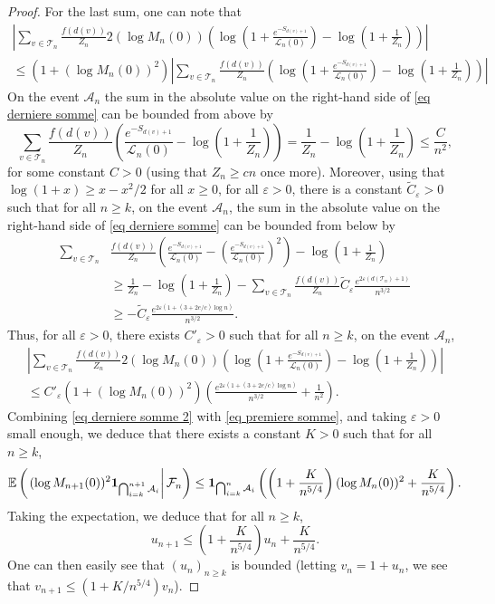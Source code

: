 \documentclass[11pt]{article}
\numberwithin{equation}{section}
\def\vp{\varepsilon}
\def \T{\mathcal{T}}
\def \cL{\mathcal{L}}
\def\E{\mathbb{E}}
\begin{document}
\begin{proof}
	For the last sum, one can note that
	\begin{multline}\label{eq derniere somme}
		 \left\vert\sum_{v \in \T_n} \frac{f(d(v))}{Z_n}2(\log M_n(0))\left(\log \left(1+ \frac{e^{-S_{d(v)+1}} }{\cL_n(0)}\right) -\log\left(1+\frac{1}{Z_n}\right)\right) \right\vert \\ 
		 \le (1+ (\log M_n(0))^2 ) \left\vert \sum_{v \in \T_n} \frac{f(d(v))}{Z_n}\left(  \log \left(1+ \frac{e^{-S_{d(v)+1}} }{\cL_n(0)}\right) -\log\left(1+\frac{1}{Z_n}\right)\right) \right\vert 
	\end{multline}
	On the event $\mathcal{A}_n$ the sum in the absolute value on the right-hand side of \eqref{eq derniere somme} can be bounded from above by
	\[
	\sum_{v \in \T_n} \frac{f(d(v))}{Z_n} \left( \frac{e^{-S_{d(v)+1}}}{\cL_n(0)} - \log \left(1+\frac{1}{Z_n}\right)\right)= \frac{1}{Z_n} - \log \left(1+ \frac{1}{Z_n}\right) \le \frac{C}{n^2},
	\]
	for some constant $C>0$ (using that $Z_n \ge cn$ once more). Moreover, using that $\log(1+x) \ge x-x^2/2$ for all $x\ge 0$, for all $\vp>0$, there is a constant $\widetilde{C}_\vp>0$ such that for all $n\ge k$, on the event $\mathcal{A}_n$, the sum in the absolute value on the right-hand side of \eqref{eq derniere somme} can be bounded from below by
	\begin{align*}
	\sum_{v \in \T_n} &\frac{f(d(v))}{Z_n}\left( \frac{e^{-S_{d(v)+1}}}{\cL_n(0)} - \left(\frac{e^{-S_{d(v)+1}}}{\cL_n(0)} \right)^2 \right) - \log \left(1+\frac{1}{Z_n}\right)\\
	&\ge  \frac{1}{Z_n} - \log \left(1+ \frac{1}{Z_n}\right)  - \sum_{v \in \T_n} \frac{f(d(v))}{Z_n} \widetilde{C}_\vp \frac{e^{2\vp (d(\T_n)+1)}}{n^{3/2}} \\
	&\ge - \widetilde{C}_\vp \frac{e^{2\vp(1+(3+2e/c)\log n)}}{n^{3/2}}.
	\end{align*}
	Thus, for all $\vp>0$, there exists $C'_\vp>0$ such that for all $n\ge k$, on the event $\mathcal{A}_n$, 
	\begin{multline}\label{eq derniere somme 2}
		\left\vert\sum_{v \in \T_n} \frac{f(d(v))}{Z_n}2(\log M_n(0))\left(\log \left(1+ \frac{e^{-S_{d(v)+1}} }{\cL_n(0)}\right) -\log\left(1+\frac{1}{Z_n}\right)\right) \right\vert \\
		\le C'_\vp (1+ (\log M_n(0))^2) \left( \frac{e^{2\vp(1+(3+2e/c)\log n)}}{n^{3/2}} +  \frac{1}{n^2} \right).
	\end{multline}
	Combining \eqref{eq derniere somme 2} with \eqref{eq premiere somme}, and taking $\vp>0$ small enough, we deduce that there exists a constant $K>0$ such that for all $n\ge k$,
	\[
	\E\left(\left. (\log M_{n+1}(0))^2 {\bf 1}_{\bigcap_{i=k}^{n+1} \mathcal{A}_i} \right\vert \mathcal{F}_n\right)\le {\bf 1}_{\bigcap_{i=k}^n \mathcal{A}_i} \left( \left(1+ \frac{K}{n^{5/4}} \right) (\log M_n(0))^2 + \frac{K}{n^{5/4}} \right).
	\]
	Taking the expectation, we deduce that for all $n\ge k$,
	\[
	u_{n+1} \le \left(1 + \frac{K}{n^{5/4}}\right) u_n + \frac{K}{n^{5/4}}.
	\]
	One can then easily see that $(u_n)_{n\ge k}$ is bounded (letting $v_n = 1+u_n$, we see that $v_{n+1} \le (1+K/n^{5/4})v_n$).
	

\end{proof}
\end{document}
